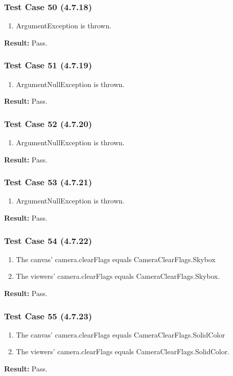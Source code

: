 \documentclass[a4paper,12pt]{article}
\begin{document}
		\subsubsection{Test Case 50 (4.7.18)}
				\begin{enumerate}
					\item ArgumentException is thrown.
				\end{enumerate}
			\textbf{Result: }Pass.
		\subsubsection{Test Case 51 (4.7.19)}
				\begin{enumerate}
					\item ArgumentNullException is thrown.
				\end{enumerate}
			\textbf{Result: }Pass.
		\subsubsection{Test Case 52 (4.7.20)}
				\begin{enumerate}
					\item ArgumentNullException is thrown.
				\end{enumerate}
			\textbf{Result: }Pass.
		\subsubsection{Test Case 53 (4.7.21)}
				\begin{enumerate}
					\item ArgumentNullException is thrown.
				\end{enumerate}
			\textbf{Result: }Pass.
		\subsubsection{Test Case 54 (4.7.22)}
				\begin{enumerate}
					\item The canvas' camera.clearFlags equals CameraClearFlags.Skybox
					\item The viewers' camera.clearFlags equals CameraClearFlags.Skybox.
				\end{enumerate}
			\textbf{Result: }Pass.
		\subsubsection{Test Case 55 (4.7.23)}
				\begin{enumerate}
					\item The canvas' camera.clearFlags equals CameraClearFlags.SolidColor
					\item The viewers' camera.clearFlags equals CameraClearFlags.SolidColor.
				\end{enumerate}
			\textbf{Result: }Pass.
\end{document}
